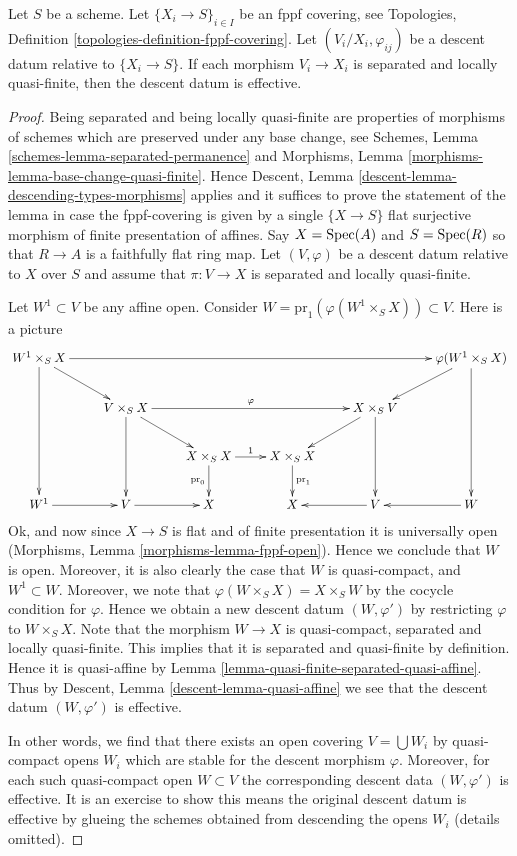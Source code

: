 \begin{lemma}
\label{lemma-separated-locally-quasi-finite-morphisms-fppf-descend}
Let $S$ be a scheme.
Let $\{X_i \to S\}_{i\in I}$ be an fppf covering, see
Topologies, Definition \ref{topologies-definition-fppf-covering}.
Let $(V_i/X_i, \varphi_{ij})$ be a descent datum
relative to $\{X_i \to S\}$. If each morphism
$V_i \to X_i$ is separated and locally quasi-finite,
then the descent datum is effective.
\end{lemma}

\begin{proof}
Being separated and being locally quasi-finite
are properties of morphisms of schemes
which are preserved under any base change, see
Schemes, Lemma \ref{schemes-lemma-separated-permanence} and
Morphisms, Lemma \ref{morphisms-lemma-base-change-quasi-finite}.
Hence Descent, Lemma \ref{descent-lemma-descending-types-morphisms}
applies and it suffices to prove the statement of the lemma
in case the fppf-covering is given by a single
$\{X \to S\}$ flat surjective morphism of finite presentation of affines.
Say $X = \mathop{\rm Spec}(A)$ and $S = \mathop{\rm Spec}(R)$ so
that $R \to A$ is a faithfully flat ring map.
Let $(V, \varphi)$ be a descent datum relative to $X$ over $S$
and assume that $\pi : V \to X$ is separated and
locally quasi-finite.

\medskip\noindent
Let $W^1 \subset V$ be any affine open.
Consider $W = \text{pr}_1(\varphi(W^1 \times_S X)) \subset V$.
Here is a picture
$$
\xymatrix{
W^1 \times_S X \ar[rrrrr] \ar[ddd] \ar[rd]
& & & & &
\varphi(W^1 \times_S X) \ar[ddd] \ar[ld] \\
& V \times_S X \ar[rrr]^\varphi \ar[rd] \ar[dd]
& & &
X \times_S V \ar[ld] \ar[dd] & \\
& &
X \times_S X \ar[r]^1 \ar[d]_{\text{pr}_0}
&
X \times_S X \ar[d]^{\text{pr}_1}
& & \\
W^1 \ar[r] &
V \ar[r] &
X &
X &
V \ar[l] &
W \ar[l]
}
$$
Ok, and now since $X \to S$ is flat and of finite presentation it
is universally open (Morphisms, Lemma \ref{morphisms-lemma-fppf-open}).
Hence we conclude that $W$ is open. Moreover, it is
also clearly the case that $W$ is quasi-compact, and
$W^1 \subset W$. Moreover, we note that
$\varphi(W \times_S X) = X \times_S W$ by the cocycle
condition for $\varphi$. Hence we obtain a new descent datum
$(W, \varphi')$ by restricting $\varphi$ to $W \times_S X$.
Note that the morphism $W \to X$ is quasi-compact, separated
and locally quasi-finite. This implies that it is
separated and quasi-finite by definition. Hence it is quasi-affine by
Lemma \ref{lemma-quasi-finite-separated-quasi-affine}.
Thus by
Descent, Lemma \ref{descent-lemma-quasi-affine}
we see that the descent datum
$(W, \varphi')$ is effective.

\medskip\noindent
In other words, we find that there exists an open covering
$V = \bigcup W_i$ by quasi-compact opens $W_i$ which are
stable for the descent morphism $\varphi$.
Moreover, for each such quasi-compact open $W \subset V$
the corresponding descent data $(W, \varphi')$ is effective.
It is an exercise to show this means the
original descent datum is effective by glueing the
schemes obtained from descending the opens $W_i$ (details omitted).
\end{proof}
